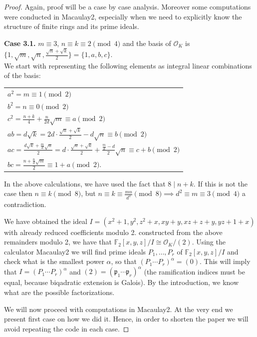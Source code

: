 \documentclass[10pt,a4paper]{amsart}
\begin{document}
\begin{proof}
Again, proof will be a case by case analysis. Moreover some computations were conducted in Macaulay2, especially when we need to explicitly know the structure of finite rings and its prime ideals.



\textbf{Case 3.1.} $m \equiv 3$, $n \equiv k \equiv 2 \pmod{4}$ and the basis of $\mathcal{O}_K$ is $\{1, \sqrt{m}, \sqrt{n}, \frac{\sqrt{n}+\sqrt{k}}{2}\} = \{1,a,b,c\}$. \\
We start with representing the following elements as integral linear combinations of the basis:
\begin{center}
\begin{tabular}{@{}l@{}}
    $a^2 = m \equiv 1 \pmod{2}$\\
    $b^2 = n \equiv 0 \pmod{2}$\\
    $c^2 = \frac{n+k}{4} + \frac{n}{2d}\sqrt{m} \equiv a \pmod{2}$\\
    $ab = d\sqrt{k} = 2d \cdot \frac{\sqrt{n} + \sqrt{k}}{2} - d\sqrt{n} \equiv b \pmod{2}$\\
    $ac = \frac{d\sqrt{k}+ \frac{m}{d} \sqrt{n}}{2} = d \cdot \frac{\sqrt{n} + \sqrt{k}}{2} + \frac{\frac{m}{d} - d}{2} \sqrt{n} \equiv c + b \pmod{2}$\\
    $bc = \frac{n + \frac{n}{d} \sqrt{m}}{2} \equiv 1 + a \pmod{2}.$
\end{tabular}
\end{center}
In the above calculations, we have used the fact that $8 \mid n+k$. If this is not the case then $n \equiv k \pmod{8}$, but $n \equiv k \equiv \frac{mn}{d^2} \pmod{8} \implies d^2 \equiv m \equiv 3 \pmod{4} $ a contradiction. 

We have obtained the ideal $I = (x^2+1,y^2,z^2+x,xy+y,xz+z+y,yz+1+x)$ with already reduced coefficients modulo 2. constructed from the above remainders modulo 2, we have that $\mathbb{F}_2[x,y,z]/I \cong \mathcal{O}_K/(2)$. Using the calculator Macaulay2 we will find prime ideals $P_1, \dots , P_r$ of $\mathbb{F}_2[x,y,z]/I$ and check what is the smallest power $\alpha$, so that $(P_1 \cdots P_r)^{\alpha} =(0)$. This will imply that $I = (P_1 \cdots P_r)^{\alpha}$ and $(2) = (\mathfrak{p}_1 \cdots \mathfrak{p}_r)^{\alpha}$ (the ramification indices must be equal, because biqadratic extension is Galois). By the introduction, we know what are the possible factorizations.


We will now proceed with computations in Macaulay2. At the very end we present first case on how we did it. Hence, in order to shorten the paper we will avoid repeating the code in each case.


\end{proof}
\end{document}

